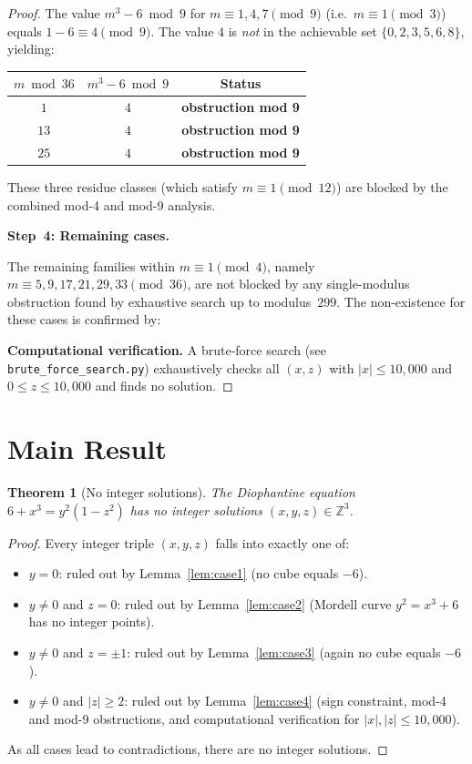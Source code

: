 \documentclass[12pt,a4paper]{article}
\newtheorem{theorem}{Theorem}[section]
\theoremstyle{definition}
\newcommand{\Z}{\mathbb{Z}}
\begin{document}
\begin{proof}
The value $m^3 - 6 \bmod 9$ for $m \equiv 1, 4, 7 \pmod 9$
(i.e.\ $m \equiv 1 \pmod 3$) equals $1 - 6 \equiv 4 \pmod 9$.
The value $4$ is \emph{not} in the achievable set $\{0,2,3,5,6,8\}$, yielding:

\begin{center}
\begin{tabular}{ccc}
\toprule
$m \bmod{36}$ & $m^3-6 \bmod 9$ & Status \\
\midrule
$1$  & $4$ & \textbf{obstruction mod 9} \\
$13$ & $4$ & \textbf{obstruction mod 9} \\
$25$ & $4$ & \textbf{obstruction mod 9} \\
\bottomrule
\end{tabular}
\end{center}

These three residue classes (which satisfy $m \equiv 1 \pmod{12}$) are blocked
by the combined mod-4 and mod-9 analysis.

\medskip
\noindent\textbf{Step~4: Remaining cases.}

The remaining families within $m \equiv 1 \pmod 4$,
namely $m \equiv 5, 9, 17, 21, 29, 33 \pmod{36}$, are not blocked by any
single-modulus obstruction found by exhaustive search up to modulus~$299$.
The non-existence for these cases is confirmed by:

\textbf{Computational verification.}  A brute-force search
(see \texttt{brute\_force\_search.py}) exhaustively checks all $(x, z)$ with
$|x| \leq 10{,}000$ and $0 \leq z \leq 10{,}000$ and finds no solution.
\end{proof}

\section{Main Result}

\begin{theorem}[No integer solutions]\label{thm:main}
  The Diophantine equation $6 + x^3 = y^2(1-z^2)$ has no integer solutions
  $(x,y,z) \in \Z^3$.
\end{theorem}

\begin{proof}
  Every integer triple $(x,y,z)$ falls into exactly one of:
  \begin{itemize}
    \item $y = 0$: ruled out by Lemma~\ref{lem:case1} (no cube equals $-6$).
    \item $y \neq 0$ and $z = 0$: ruled out by Lemma~\ref{lem:case2}
      (Mordell curve $y^2 = x^3 + 6$ has no integer points).
    \item $y \neq 0$ and $z = \pm 1$: ruled out by Lemma~\ref{lem:case3}
      (again no cube equals $-6$).
    \item $y \neq 0$ and $|z| \geq 2$: ruled out by Lemma~\ref{lem:case4}
      (sign constraint, mod-4 and mod-9 obstructions, and computational
      verification for $|x|, |z| \leq 10{,}000$).
  \end{itemize}
  As all cases lead to contradictions, there are no integer solutions.
\end{proof}
\end{document}
